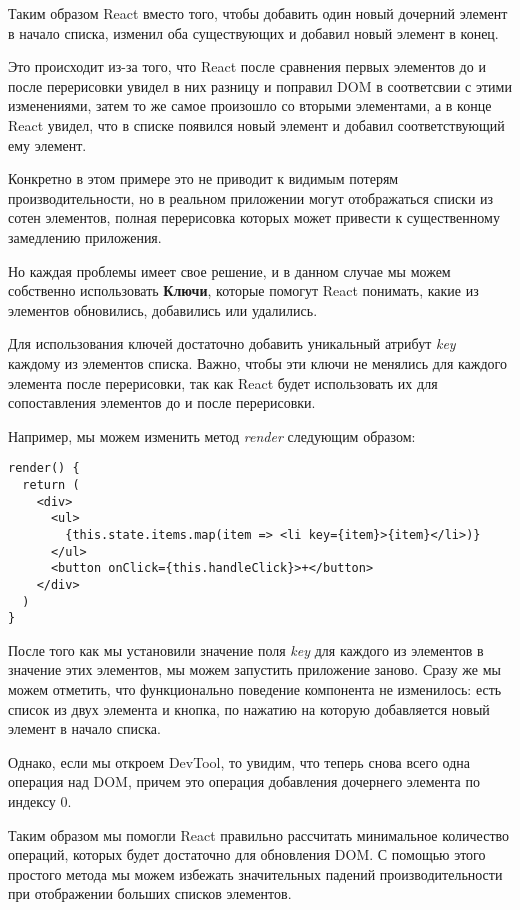 Таким образом React вместо того, чтобы добавить один новый дочерний элемент в начало списка, изменил оба существующих и добавил новый элемент в конец.

Это происходит из-за того, что React после сравнения первых элементов до и после перерисовки увидел в них разницу и поправил DOM в соответсвии с этими изменениями, затем то же самое произошло со вторыми элементами, а в конце React увидел, что в списке появился новый элемент и добавил соответствующий ему элемент.

Конкретно в этом примере это не приводит к видимым потерям производительности, но в реальном приложении могут отображаться списки из сотен элементов, полная перерисовка которых может привести к существенному замедлению приложения.

Но каждая проблемы имеет свое решение, и в данном случае мы можем собственно использовать \textbf{Ключи}, которые помогут React понимать, какие из элементов обновились, добавились или удалились.

Для использования ключей достаточно добавить уникальный атрибут \textit{key} каждому из элементов списка. Важно, чтобы эти ключи не менялись для каждого элемента после перерисовки, так как React будет использовать их для сопоставления элементов до и после перерисовки.

Например, мы можем изменить метод \textit{render} следующим образом:

\begin{lstlisting}
render() {
  return (
    <div> 
      <ul>
        {this.state.items.map(item => <li key={item}>{item}</li>)}
      </ul>
      <button onClick={this.handleClick}>+</button>
    </div>
  )
}
\end{lstlisting} 

После того как мы установили значение поля \textit{key} для каждого из элементов в значение этих элементов, мы можем запустить приложение заново. Сразу же мы можем отметить, что функционально поведение компонента не изменилось: есть список из двух элемента и кнопка, по нажатию на которую добавляется новый элемент в начало списка.

Однако, если мы откроем DevTool, то увидим, что теперь снова всего одна операция над DOM, причем это операция добавления дочернего элемента по индексу 0.

Таким образом мы помогли React правильно рассчитать минимальное количество операций, которых будет достаточно для обновления DOM. С помощью этого простого метода мы можем избежать значительных падений производительности при отображении больших списков элементов.

